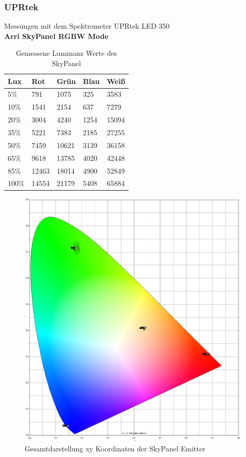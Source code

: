 \documentclass[11pt]{scrartcl}
\begin{document}
\subsubsection{UPRtek}
Messungen mit dem Spektrometer UPRtek LED 350\\
\textbf{Arri SkyPanel RGBW Mode}
\begin{table}[H]
    \begin{tabularx}{\textwidth}{|X|X|X|X|X|}
        \hline
        Lux   & Rot   & Grün  & Blau & Weiß \\\hline
        5\%   & 791   & 1075  & 325  & 3583 \\\hline
        10\%  & 1541  & 2154  & 637  & 7279 \\\hline
        20\%  & 3004  & 4240  & 1254 & 15094\\\hline
        35\%  & 5221  & 7383  & 2185 & 27255\\\hline
        50\%  & 7459  & 10621 & 3139 & 36158\\\hline
        65\%  & 9618  & 13785 & 4020 & 42448\\\hline
        85\%  & 12463 & 18014 & 4900 & 52849\\\hline
        100\% & 14554 & 21179 & 5408 & 65884\\\hline
    \end{tabularx}
    \caption{Gemessene Luminanz Werte des SkyPanel} \label{table:luxSkypanel}
\end{table}
\noindent
\begin{figure}[H]
    \begin{center}
        \includegraphics[width=\textwidth]{images/macAdam/skypanelTotal.png}
    \end{center}
    \caption{Gesamtdarstellung xy Koordinaten der SkyPanel Emitter}
\end{figure}
\end{document}
